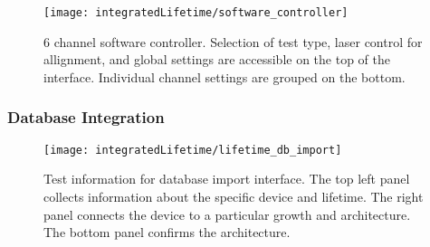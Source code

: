 \documentclass[../thesis.tex]{subfiles}
\begin{document}
\begin{figure}[ht]
    \centering
    \texttt{[image: integratedLifetime/software\_controller]}
\caption{6 channel software controller.  Selection of test type, laser control for allignment, and global settings are accessible on the top of the interface.  Individual channel settings are grouped on the bottom.}
\label{fig:software_controller}
\end{figure}

\subsubsection{Database Integration}
\begin{figure}[ht]
    \centering
    \texttt{[image: integratedLifetime/lifetime\_db\_import]}
\caption{Test information for database import interface.  The top left panel collects information about the specific device and lifetime.  The right panel connects the device to a particular growth and architecture.  The bottom panel confirms the architecture.}
\label{fig:lifetime_db_import}
\end{figure}


\end{document}
